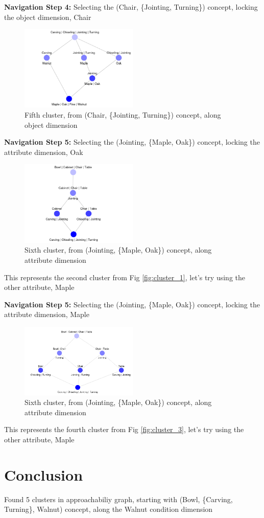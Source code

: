 \documentclass{article}
\begin{document}
\textbf{Navigation Step 4:} Selecting the (Chair, \{Jointing, Turning\}) concept, locking the object dimension, Chair

\begin{figure}[htbp]
  \centering
  \includegraphics[width=0.5\textwidth]{cluster_4.png}
  \caption{Fifth cluster, from (Chair, \{Jointing, Turning\}) concept, along object dimension}
  \label{fig:cluster_4}
\end{figure}


\newpage
\textbf{Navigation Step 5:} Selecting the (Jointing, \{Maple, Oak\}) concept, locking the attribute dimension, Oak

\begin{figure}[htbp]
  \centering
  \includegraphics[width=0.5\textwidth]{cluster_5.png}
  \caption{Sixth cluster, from (Jointing, \{Maple, Oak\}) concept, along attribute dimension}
  \label{fig:cluster_5}
\end{figure}

This represents the second cluster from Fig \ref{fig:cluster_1}, let's try using the other attribute, Maple

\textbf{Navigation Step 5:} Selecting the (Jointing, \{Maple, Oak\}) concept, locking the attribute dimension, Maple

\begin{figure}[htbp]
  \centering
  \includegraphics[width=0.5\textwidth]{cluster_5_2.png}
  \caption{Sixth cluster, from (Jointing, \{Maple, Oak\}) concept, along attribute dimension}
  \label{fig:cluster_5_2}
\end{figure}

This represents the fourth cluster from Fig \ref{fig:cluster_3}, let's try using the other attribute, Maple

\section*{Conclusion}
Found 5 clusters in approachabiliy graph, starting with (Bowl, \{Carving, Turning\}, Walnut) concept, along the Walnut condition dimension
\end{document}
